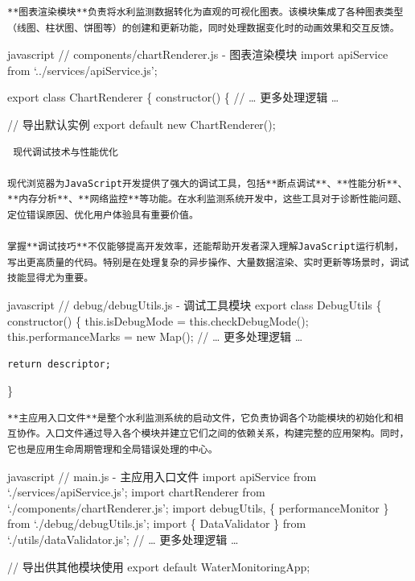 {{\begin{lstlisting}
**图表渲染模块**负责将水利监测数据转化为直观的可视化图表。该模块集成了各种图表类型（线图、柱状图、饼图等）的创建和更新功能，同时处理数据变化时的动画效果和交互反馈。
\end{lstlisting}

javascript // components/chartRenderer.js - 图表渲染模块 import apiService from `../services/apiService.js';

export class ChartRenderer \{ constructor() \{ // \ldots{} 更多处理逻辑 \ldots{}

// 导出默认实例 export default new ChartRenderer();

\begin{lstlisting}
 现代调试技术与性能优化

现代浏览器为JavaScript开发提供了强大的调试工具，包括**断点调试**、**性能分析**、**内存分析**、**网络监控**等功能。在水利监测系统开发中，这些工具对于诊断性能问题、定位错误原因、优化用户体验具有重要价值。

掌握**调试技巧**不仅能够提高开发效率，还能帮助开发者深入理解JavaScript运行机制，写出更高质量的代码。特别是在处理复杂的异步操作、大量数据渲染、实时更新等场景时，调试技能显得尤为重要。
\end{lstlisting}

javascript // debug/debugUtils.js - 调试工具模块 export class DebugUtils \{ constructor() \{ this.isDebugMode = this.checkDebugMode(); this.performanceMarks = new Map(); // \ldots{} 更多处理逻辑 \ldots{}

\begin{verbatim}
return descriptor;
\end{verbatim}

\}

\begin{lstlisting}
**主应用入口文件**是整个水利监测系统的启动文件，它负责协调各个功能模块的初始化和相互协作。入口文件通过导入各个模块并建立它们之间的依赖关系，构建完整的应用架构。同时，它也是应用生命周期管理和全局错误处理的中心。
\end{lstlisting}

javascript // main.js - 主应用入口文件 import apiService from `./services/apiService.js'; import chartRenderer from `./components/chartRenderer.js'; import debugUtils, \{ performanceMonitor \} from `./debug/debugUtils.js'; import \{ DataValidator \} from `./utils/dataValidator.js'; // \ldots{} 更多处理逻辑 \ldots{}

// 导出供其他模块使用 export default WaterMonitoringApp;

}}
